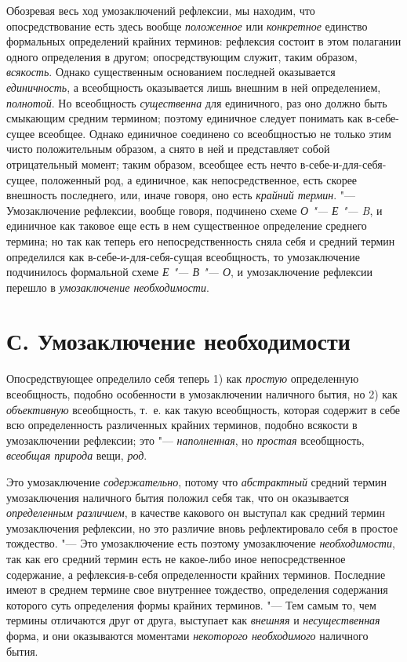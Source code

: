 {{Обозревая весь ход умозаключений рефлексии, мы находим, что
опосредствование есть здесь вообще
{\em положенное} или
{\em конкретное} единство
формальных определений крайних терминов: рефлексия состоит в этом полагании
одного определения в другом; опосредствующим служит, таким образом,
{\em всякость}. Однако
существенным основанием последней оказывается
{\em единичность}, а
всеобщность оказывается лишь внешним в ней определением,
{\em полнотой}. Но
всеобщность {\em существенна}
для единичного, раз оно должно быть смыкающим средним
термином; поэтому единичное следует понимать как в-себе-сущее всеобщее.
Однако единичное соединено со всеобщностью не только этим чисто
положительным образом, а снято в ней и представляет собой отрицательный
момент; таким образом, всеобщее есть нечто в-себе-и-для-себя-сущее,
положенный род, а единичное, как непосредственное, есть скорее внешность
последнего, или, иначе говоря, оно есть
{\em крайний термин}. "---
Умозаключение рефлексии, вообще говоря, подчинено схеме
{\em О "--- Е "--- B},
и единичное как таковое еще есть в нем существенное
определение среднего термина; но так как теперь его непосредственность
сняла себя и средний термин определился как
в-себе-и-для-себя-сущая всеобщность, то умозаключение
подчинилось формальной схеме {\em Е
"--- В "--- О}, и умозаключение
рефлексии перешло в {\em умозаключение
необходимости}.

\section[С. Умозаключение необходимости]{С. Умозаключение необходимости}
Опосредствующее определило себя теперь 1) как
{\em простую}
определенную всеобщность, подобно особенности в умозаключении
наличного бытия, но 2) как
{\em объективную}
всеобщность, т.~е. как такую всеобщность, которая содержит в
себе всю определенность различенных крайних терминов, подобно всякости в
умозаключении рефлексии; это
"--- {\em наполненная}, но
{\em простая}
всеобщность, {\em всеобщая
природа} вещи,
{\em род}.

Это умозаключение
{\em содержательно},
потому что
{\em абстрактный} средний
термин умозаключения наличного бытия положил себя так, что он оказывается
{\em определенным различием},
в качестве какового он выступал как средний термин
умозаключения рефлексии, но это различие вновь рефлектировало себя в
простое тождество. "--- Это умозаключение есть поэтому
умозаключение {\em необходимости},
так как его средний термин есть не какое-либо иное
непосредственное содержание, а рефлексия-в-себя определенности крайних
терминов. Последние имеют в среднем термине свое внутреннее тождество,
определения содержания которого суть определения формы крайних терминов. "---
Тем самым то, чем термины отличаются друг от друга, выступает
как {\em внешняя} и
{\em несущественная}
форма, и они оказываются моментами
{\em некоторого необходимого}
наличного бытия.

}}
